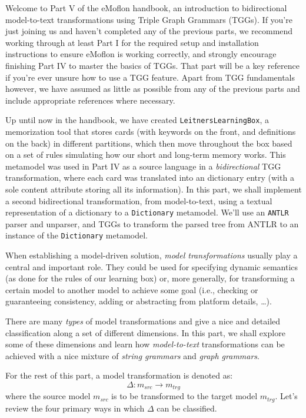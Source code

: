 \genHeader

Welcome to Part V of the eMoflon handbook, an introduction to bidirectional model-to-text transformations using Triple Graph Grammars (TGGs). If you're just
joining us and haven't completed any of the previous parts, we recommend working through at least Part I for the required setup and installation instructions
to ensure eMoflon is working correctly, and strongly encourage finishing Part IV to master the basics of TGGs. That part will be a key reference if you're ever
unsure how to use a TGG feature. Apart from TGG fundamentals however, we have assumed as little as possible from any of the previous parts and
include appropriate references where necessary.

Up until now in the handbook, we have created \texttt{LeitnersLearningBox}, a memorization tool that stores cards (with keywords on the front, and definitions
on the back) in different partitions, which then move throughout the box based on a set of rules simulating how our short and long-term memory works. This
metamodel was used in Part IV as a source language in a \emph{bidirectional}  TGG transformation, where each card was
translated into an dictionary entry (with a sole content attribute storing all its information). In this part, we shall implement a second
bidirectional transformation, from model-to-text, using a textual representation of a dictionary to a \texttt{Dictionary} metamodel.
We'll use an \texttt{ANTLR}~\cite{ANTLR} parser and unparser, and TGGs to transform the parsed tree from ANTLR to an instance of the \texttt{Dictionary}
metamodel.

When establishing a model-driven solution, \emph{model transformations} usually play a central and important role. They could be used for specifying dynamic
semantics (as done for the rules of our learning box) or, more generally, for transforming a certain model to another model to achieve some goal (i.e.,
checking or guaranteeing consistency, adding or abstracting from platform details, \ldots).

There are many \emph{types} of model transformations and \cite{CH03,Mens_Gorp_2006} give a nice and detailed classification along a set of different dimensions.
In this part, we shall explore some of these dimensions and learn how \emph{model-to-text} transformations can be achieved with a nice mixture of \emph{string
grammars} and \emph{graph grammars}.

For the rest of this part, a model transformation is denoted as:
\begin{displaymath}
 	\Delta: m_{src} \rightarrow m_{trg}
\end{displaymath}
where the source model $m_{src}$ is to be transformed to the target model $m_{trg}$. Let's review the four primary ways in which $\Delta$ can be classified.


